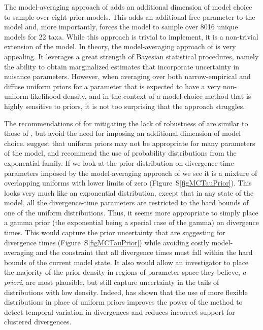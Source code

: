 The model-averaging approach of \citet{Hickerson2013} adds an additional
dimension of model choice to sample over eight prior models.
This adds an additional free parameter to the model and, more importantly,
forces the model to sample over 8016 unique models for 22 taxa.
While this approach is trivial to implement, it is a non-trivial extension of
the model.
In theory, the model-averaging approach of \citet{Hickerson2013} is very
appealing.
It leverages a great strength of Bayesian statistical procedures, namely the
ability to obtain marginalized estimates that incorporate uncertainty in
nuisance parameters.
However, when averaging over both narrow-empirical and diffuse uniform priors
for a parameter that is expected to have a very non-uniform likelihood density,
and in the context of a model-choice method that is highly sensitive to priors,
it is not too surprising that the approach struggles.

The recommendations of \citet{Oaks2012} for mitigating the lack of robustness
of \msb are similar to those of \citet{Hickerson2013}, but avoid the
need for imposing an additional dimension of model choice.
\citet{Oaks2012} suggest that uniform priors may not be appropriate for many
parameters of the \msb model, and recommend the use of probability
distributions from the exponential family.
If we look at the prior distribution on divergence-time parameters imposed by
the model-averaging approach of \citet{Hickerson2013} we see it is a mixture of
overlapping uniforms with lower limits of zero (Figure~S\ref{figMCTauPrior}).
This looks very much like an exponential distribution, except that in any state
of the model, all the divergence-time parameters are restricted to the hard
bounds of one of the uniform distributions.
Thus, it seems more appropriate to simply place a gamma prior (the exponential
being a special case of the gamma) on divergence times.
This would capture the prior uncertainty that \citet{Hickerson2013} are
suggesting for divergence times (Figure~S\ref{figMCTauPrior}) while avoiding
costly model-averaging and the constraint that all divergence times must fall
within the hard bounds of the current model state.
It also would allow an investigator to place the majority of the prior density
in regions of parameter space they believe, \emph{a priori}, are most
plausible, but still capture uncertainty in the tails of distributions with low
density.
Indeed, \citet{Oaks2014dpp} has shown that the use of more flexible
distributions in place of uniform priors improves the power of the method to
detect temporal variation in divergences and reduces incorrect support for
clustered divergences.



